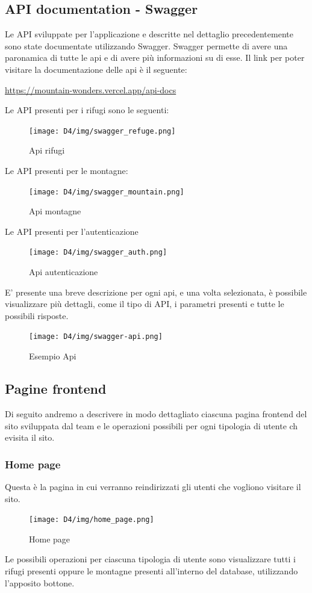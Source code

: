 \documentclass[a4paper,12pt]{article}
\begin{document}
\newpage
\subsection{API documentation - Swagger}

Le API sviluppate per l'applicazione e descritte nel dettaglio precedentemente sono state documentate utilizzando Swagger. Swagger permette di avere una paronamica di tutte le api e di avere più informazioni su di esse.
Il link per poter visitare la documentazione delle api è il seguente: 
\newline

\centerline{\url{ https://mountain-wonders.vercel.app/api-docs }}

Le API presenti per i rifugi sono le seguenti:
\begin{figure}[H]
    \centering
    \texttt{[image: D4/img/swagger\_refuge.png]}
    \caption{Api rifugi}
\end{figure}

Le API presenti per le montagne:
\begin{figure}[H]
    \centering
    \texttt{[image: D4/img/swagger\_mountain.png]}
    \caption{Api montagne}
\end{figure}

Le API presenti per l'autenticazione
\begin{figure}[H]
    \centering
    \texttt{[image: D4/img/swagger\_auth.png]}
    \caption{Api autenticazione}
\end{figure}



E' presente una breve descrizione per ogni api, e una volta selezionata, è possibile visualizzare più dettagli, come il tipo di API, i parametri presenti e tutte le possibili risposte. 

\begin{figure}[H]
    \centering
    \texttt{[image: D4/img/swagger-api.png]}
    \caption{Esempio Api}
\end{figure}


\subsection{Pagine frontend}
Di seguito andremo a descrivere in modo dettagliato ciascuna pagina frontend del sito sviluppata dal team e le operazioni possibili per ogni tipologia di utente ch evisita il sito.

\subsubsection{Home page}
Questa è la pagina in cui verranno reindirizzati gli utenti che vogliono visitare il sito.
\begin{figure}[H]
    \centering
    \texttt{[image: D4/img/home\_page.png]}
    \caption{Home page}
\end{figure}
Le possibili operazioni per ciascuna tipologia di utente sono visualizzare tutti i rifugi presenti oppure le montagne presenti all'interno del database, utilizzando l'apposito bottone.
\end{document}

